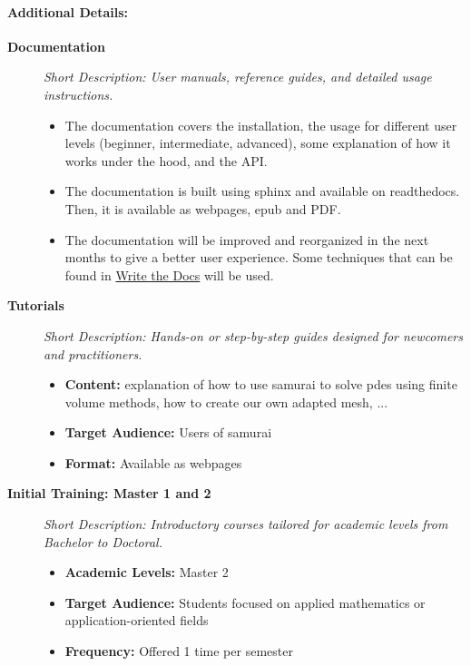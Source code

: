 \paragraph{Additional Details:}
\begin{description}
\item[\textbf{Documentation}] %
\emph{Short Description: User manuals, reference guides, and detailed usage instructions.}

\begin{itemize}
  \item The documentation covers the installation, the usage for different user levels (beginner, intermediate, advanced), some explanation of how it works under the hood, and the API.
  \item The documentation is built using sphinx and available on readthedocs. Then, it is available as webpages, epub and PDF.
  \item The documentation will be improved and reorganized in the next months to give a better user experience. Some techniques that can be found in \href{https://www.writethedocs.org}{Write the Docs} will be used.
\end{itemize}

\item[\textbf{Tutorials}]
\emph{Short Description: Hands-on or step-by-step guides designed for newcomers and practitioners.}

\begin{itemize}
\item \textbf{Content:} explanation of how to use samurai to solve pdes using finite volume methods, how to create our own adapted mesh, ...
\item \textbf{Target Audience:} Users of samurai
\item \textbf{Format:} Available as webpages
\end{itemize}

\item[\textbf{Initial Training: Master 1 and 2}]
\emph{Short Description: Introductory courses tailored for academic levels from Bachelor to Doctoral.}

\begin{itemize}
\item \textbf{Academic Levels:} Master 2
\item \textbf{Target Audience:} Students focused on applied mathematics or application-oriented fields
\item \textbf{Frequency:} Offered 1 time per semester
\end{itemize}

\end{description}



